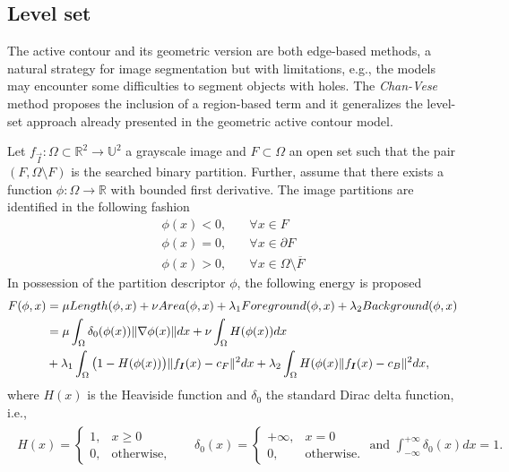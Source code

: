 \subsection{Level set}
	The active contour and its geometric version are both edge-based methods, a natural strategy for image segmentation but with limitations, e.g., the models may encounter some difficulties to segment objects with holes. The \emph{Chan-Vese} method proposes the inclusion of a region-based term and it generalizes the level-set approach already presented in the geometric active contour model. 
	
	Let $f_{\vec{I}}:\Omega \subset \mathbb{R}^2 \rightarrow \mathbb{U}^2$ a grayscale image and $F \subset \Omega$ an open set such that the pair $(F,\Omega \setminus F)$ is the searched binary partition. Further, assume that there exists a function $\phi: \Omega \rightarrow \mathbb{R}$ with bounded first derivative. The image partitions are identified in the following fashion
\begin{align*}
	\phi(x) < 0,&\quad \forall x \in F \\
	\phi(x) = 0,&\quad \forall x \in \partial F\\
	\phi(x) > 0,&\quad \forall x \in \Omega \setminus \overline{F}
\end{align*}
%	
	In possession of the partition descriptor $\phi$, the following energy is proposed	
\begin{align}
	F(\phi,x) &= \mu Length(\phi,x) + \nu Area(\phi,x) + \lambda_1 Foreground(\phi,x) + \lambda_2 Background(\phi,x) \nonumber \\	
	&= \mu \int_{\Omega}{\delta_0(\phi(x))\lVert \nabla \phi(x)\rVert dx} + \nu \int_{\Omega}{H(\phi(x))dx} \nonumber \\
	&+ \lambda_1 \int_{\Omega}{\big(1-H(\phi(x))\big)\lVert f_{\bm{I}}(x) - c_F\rVert^2dx} + \lambda_2\int_{\Omega}{H(\phi(x)\lVert f_{\bm{I}}(x)-c_B\rVert^2dx},
	\label{ch1:eq:chan-vese-functional}
\end{align}
%
where $H(x)$ is the Heaviside function and $\delta_0$ the standard Dirac delta function, i.e.,
\begin{align*}
\begin{array}{ll}
	H(x) = \left\{ \begin{array}{ll}
		1, & x \geq 0 \\
		0, & \text{otherwise},
	\end{array}\right. & \quad 
	\delta_0( x ) = \left\{ \begin{array}{ll}
								+ \infty,& x=0\\
								0,& \text{otherwise}.
							\end{array}\right. \text{ and } \int_{-\infty}^{+\infty}{\delta_0(x)dx}=1.
\end{array}
\end{align*}
